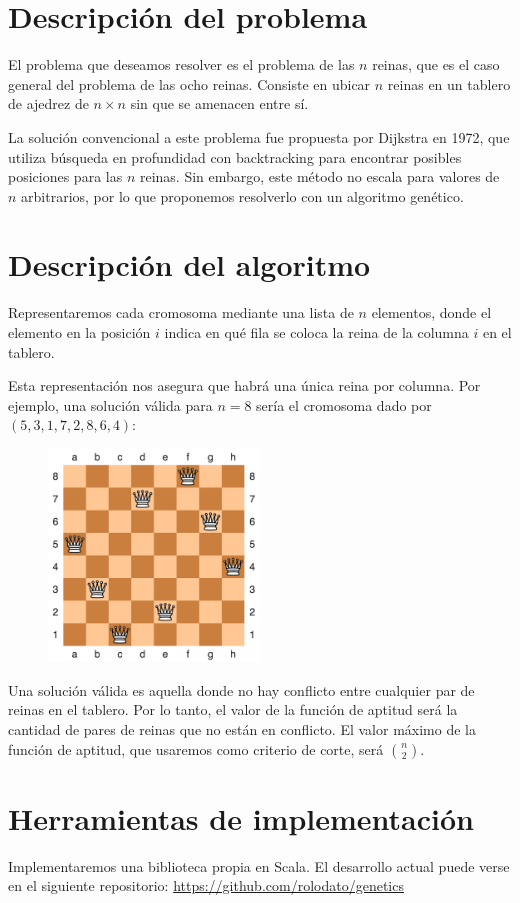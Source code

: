 \documentclass[a4paper,12pt]{article}
\begin{document}
\section{Descripción del problema}

El problema que deseamos resolver es el problema de las $n$ reinas,
que es el caso general del problema de las ocho reinas.
Consiste en ubicar $n$ reinas en un tablero de ajedrez de $n \times n$ sin que se amenacen entre sí\cite{weisstein}.

La solución convencional a este problema fue propuesta por Dijkstra en 1972,
que utiliza búsqueda en profundidad con \foreignlanguage{english}{backtracking} para encontrar posibles posiciones para las $n$ reinas.
Sin embargo, este método no escala para valores de $n$ arbitrarios,
por lo que proponemos resolverlo con un algoritmo genético\cite{thada}.

\section{Descripción del algoritmo}

Representaremos cada cromosoma mediante una lista de $n$ elementos,
donde el elemento en la posición $i$ indica en qué fila se coloca la reina de la columna $i$ en el tablero.

Esta representación nos asegura que habrá una única reina por columna.
Por ejemplo, una solución válida\cite{wiki} para $n = 8$ sería el cromosoma dado por $(5, 3, 1, 7, 2, 8, 6, 4)$:

\begin{figure}[h]
\centering
\includegraphics[width=0.5\textwidth]{nqueen-solution-8.png}
\end{figure}

Una solución válida es aquella donde no hay conflicto entre cualquier par de reinas en el tablero.
Por lo tanto, el valor de la función de aptitud será la cantidad de pares de reinas que no están en conflicto.
El valor máximo de la función de aptitud,
que usaremos como criterio de corte,
será $n \choose 2$.

\section{Herramientas de implementación}

Implementaremos una biblioteca propia en Scala.
El desarrollo actual puede verse en el siguiente repositorio: \url{https://github.com/rolodato/genetics}


\printbibliography
\end{document}
